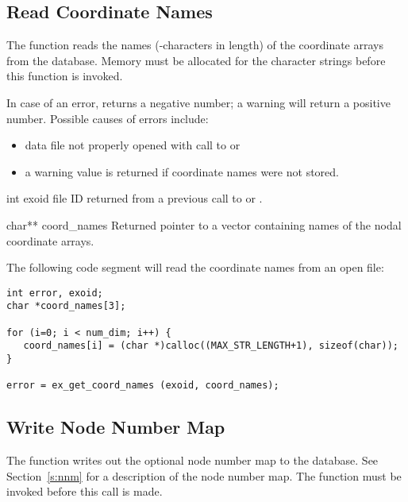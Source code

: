\subsection{Read Coordinate Names}

The function  reads the names
(-characters in length) of the coordinate arrays
from the database. Memory must be allocated for the character strings
before this function is invoked.


In case of an error,  returns 
a negative number; a warning will return a positive number. 
Possible causes of errors include:


\begin{itemize}
 \item data file not properly opened with call to 
 or 

 \item a warning value is returned if coordinate names were not
 stored.
\end{itemize}


\begin{parameters}
\item[{int exoid \R{}}]
\exo{} file ID returned from a previous call to  or
.

\item[{char** coord_names \W{}}]
Returned pointer to a vector containing  names of the nodal
coordinate arrays.
\end{parameters}

The following code segment will read the coordinate names from an open
\exo{} file:

\begin{lstlisting}
int error, exoid;
char *coord_names[3];

for (i=0; i < num_dim; i++) {
   coord_names[i] = (char *)calloc((MAX_STR_LENGTH+1), sizeof(char));
}

error = ex_get_coord_names (exoid, coord_names);
\end{lstlisting}


\subsection{Write Node Number Map}

The function  writes out the optional
node number map to the database. See Section~\ref{s:nnm} for a
description of the node number map. The function 
must be invoked before this call is made.

